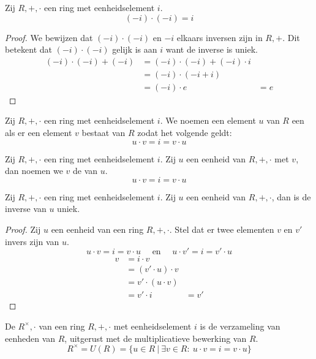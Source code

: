 \documentclass[main.tex]{subfiles}
\begin{document}
\begin{ei}
  Zij $R,+,\cdot$ een ring met eenheidselement $i$.
  \[ (-i) \cdot (-i) = i\]
  \begin{proof}
    We bewijzen dat $(-i) \cdot (-i)$ en $-i$ elkaars inversen zijn in $R,+$.
    Dit betekent dat $(-i) \cdot (-i)$ gelijk is aan $i$ want de inverse is uniek.
    \[
    \begin{array}{rll}
      (-i) \cdot (-i) + (-i) &= (-i) \cdot (-i) + (-i) \cdot i &\\
                             &= (-i) \cdot (-i + i) &\\
                             &= (-i) \cdot e &= e
    \end{array}
    \]
  \end{proof}
\end{ei}

\begin{de}
  Zij $R,+,\cdot$ een ring met eenheidselement $i$.
  We noemen een element $u$ van $R$ een  als er een element $v$ bestaat van $R$ zodat het volgende geldt:
  \[ u \cdot v = i = v \cdot u \]
\end{de}

\begin{de}
  Zij $R,+,\cdot$ een ring met eenheidselement $i$.
  Zij $u$ een eenheid van $R,+,\cdot$ met $v$, dan noemen we $v$ de  van $u$.
  \[ u \cdot v = i = v \cdot u \]
\end{de}

\begin{st}
  Zij $R,+,\cdot$ een ring met eenheidselement $i$.
  Zij $u$ een eenheid van $R,+,\cdot$, dan is de inverse van $u$ uniek.

  \begin{proof}
    Zij $u$ een eenheid van een ring $R,+,\cdot$.
    Stel dat er twee elementen $v$ en $v'$ invers zijn van $u$.
    \[ u \cdot v = i = v \cdot u \quad\text{ en }\quad u \cdot v' = i = v' \cdot u \]
    \[
    \begin{array}{rll}
      v &= i \cdot v &\\
        &= (v' \cdot u) \cdot v &\\
        &= v' \cdot (u \cdot v) &\\
        &= v' \cdot i &= v'
    \end{array}
    \]
  \end{proof}
\end{st}

\begin{de}
  De  $R^{\times},\cdot$ van een ring $R,+,\cdot$ met eenheidselement $i$ is de verzameling van eenheden van $R$, uitgerust met de multiplicatieve bewerking van $R$.
  \[ R^{\times} = U(R) = \{ u \in R \ |\ \exists v \in R:\ u \cdot v = i = v \cdot u \} \]
\end{de}
\end{document}
